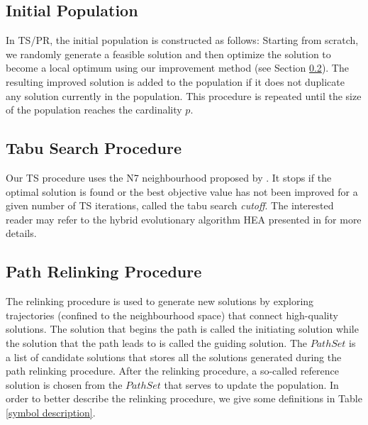 \documentclass[authoryear,12pt]{elsarticle}
\begin{document}
\subsection{Initial Population}
\label{subsec initial}

 In TS/PR, the initial population is constructed as follows: Starting from scratch, we randomly generate a feasible solution and then optimize the solution to become a local optimum using our improvement method (see Section \ref{subsec TS}). The resulting improved solution is added to the population if it does not duplicate any solution currently in  the population. This procedure is repeated until the size of  the population
reaches the cardinality $p$.

\subsection{Tabu Search Procedure}
\label{subsec TS}


Our TS procedure uses the N7 neighbourhood proposed by \cite{Zhang2007TS}. It stops if the optimal solution is found or the best objective value has not been improved for a given number of TS iterations, called the tabu search \textsl{cutoff}. The interested reader may refer to the hybrid evolutionary algorithm HEA presented in \cite{Cheng2013HEA} for more details.

\subsection{Path Relinking Procedure}
\label{subsec PR}

The relinking procedure is used to generate new solutions by exploring trajectories (confined to the neighbourhood space) that connect high-quality solutions. The solution that begins the path is called the initiating solution while the solution that the path leads to is called the guiding solution. The $PathSet$ is a list of candidate solutions that stores all the solutions generated during the path relinking procedure. After the relinking procedure, a so-called reference solution is chosen from the $PathSet$ that serves to update the population. In order to better describe the relinking procedure, we give some definitions in Table \ref{symbol description}.
\end{document}
